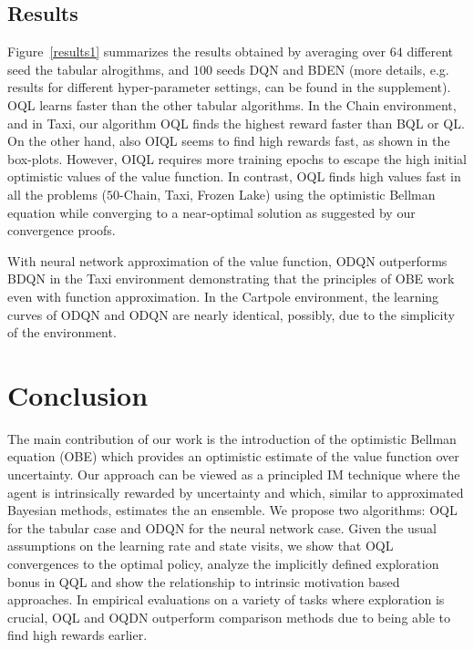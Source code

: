 \subsection{Results}
Figure~\ref{results1} summarizes the results obtained by averaging over $64$ different seed the tabular alrogithms, and $100$ seeds DQN and BDEN (more details, e.g. results for different hyper-parameter 
settings, can be found in the supplement).
OQL learns faster than the other tabular algorithms. In the Chain environment, and in Taxi,
our algorithm OQL finds the highest reward faster than BQL or QL. On the other hand, also OIQL seems to find
high rewards fast, as shown in the box-plots. However, OIQL requires more training epochs to escape the high initial
optimistic values of the value function. In contrast, OQL finds high values fast in all the problems
($50$-Chain, Taxi, Frozen Lake) using the optimistic Bellman equation
while converging to a near-optimal solution as suggested by our convergence proofs.

With neural network approximation of the value function, ODQN outperforms BDQN in the Taxi environment
demonstrating that the principles of OBE work even with function approximation. In the Cartpole environment,
the learning curves of ODQN and ODQN are nearly identical, possibly, due to the simplicity of the environment.


\section{Conclusion}

The main contribution of our work is the introduction of the optimistic Bellman equation (OBE) which
provides an optimistic estimate of the value function over uncertainty. Our approach can be viewed as a
principled IM technique where the agent is intrinsically rewarded by uncertainty and which, similar to
approximated Bayesian methods, estimates the  an ensemble. We propose two
algorithms: OQL for the tabular case and ODQN for the neural network case. Given the usual assumptions
on the learning rate and state visits, we show that OQL convergences to the optimal policy, 
analyze the implicitly defined exploration bonus in QQL and show the relationship to intrinsic
motivation based approaches. In empirical
evaluations on a variety of tasks where exploration is crucial, OQL and OQDN outperform comparison
methods due to being able to find high rewards earlier.

